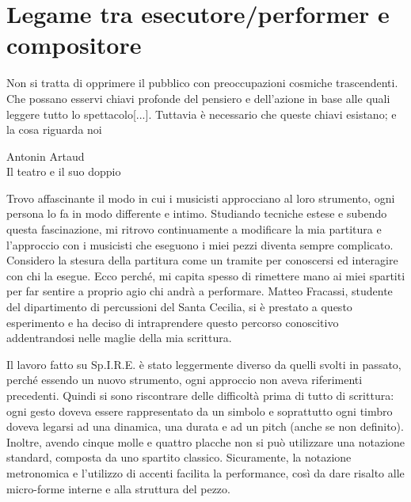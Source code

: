 
\section{Legame tra esecutore/performer 
e compositore}

\epigraph{Non si tratta di opprimere il pubblico con preoccupazioni cosmiche trascendenti. Che possano esservi chiavi profonde del pensiero e dell'azione in base alle quali leggere tutto lo spettacolo[...].
Tuttavia è necessario che queste chiavi esistano; e la cosa riguarda noi}{Antonin Artaud \\ Il teatro e il suo doppio}

Trovo affascinante il modo in cui i musicisti approcciano al loro strumento, ogni persona lo fa in modo differente e intimo. Studiando tecniche estese e subendo questa fascinazione, mi ritrovo continuamente a modificare la mia partitura e l'approccio con i musicisti che eseguono i miei pezzi diventa sempre complicato. Considero la stesura della partitura come un tramite per conoscersi ed interagire con chi la esegue. Ecco perché, mi capita spesso di rimettere mano ai miei spartiti per far sentire a proprio agio chi andrà a performare. Matteo Fracassi, studente del dipartimento di percussioni del Santa Cecilia, si è prestato a questo esperimento e ha deciso di intraprendere questo percorso conoscitivo addentrandosi nelle maglie della mia scrittura.

Il lavoro fatto su Sp.I.R.E. è stato leggermente diverso da quelli svolti in passato, perché essendo un nuovo strumento, ogni approccio non aveva riferimenti precedenti. Quindi si sono riscontrare delle difficoltà prima di tutto di scrittura: ogni gesto doveva essere rappresentato da un simbolo e soprattutto ogni timbro doveva legarsi ad una dinamica, una durata e ad un pitch (anche se non definito). Inoltre, avendo cinque molle e quattro placche non si può utilizzare una notazione standard, composta da uno spartito classico. Sicuramente, la notazione metronomica e l'utilizzo di accenti facilita la performance, così da dare risalto alle micro-forme interne e alla struttura del pezzo.

